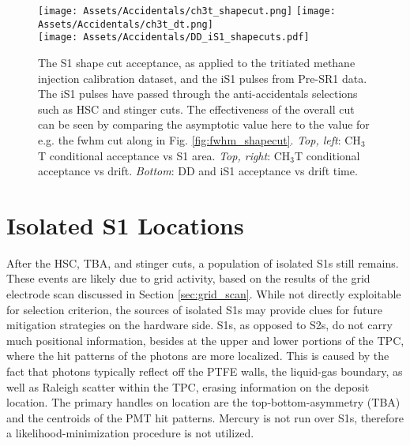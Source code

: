 \begin{figure}
    \centering
    \texttt{[image: Assets/Accidentals/ch3t\_shapecut.png]}
    \texttt{[image: Assets/Accidentals/ch3t\_dt.png]}\\
    \texttt{[image: Assets/Accidentals/DD\_iS1\_shapecuts.pdf]}
    \caption[The S1 shape cut acceptance, as applied to the tritiated methane injection calibration dataset, and the iS1 pulses from Pre-SR1 data.]%
    {The S1 shape cut acceptance, as applied to the tritiated methane injection calibration dataset, and the iS1 pulses from Pre-SR1 data.
    The iS1 pulses have passed through the anti-accidentals selections such as HSC and stinger cuts.
    The effectiveness of the overall cut can be seen by comparing the asymptotic value here to the value for e.g. the fwhm cut along in Fig. \ref{fig:fwhm_shapecut}.
    \textit{Top, left}: CH$_3$T conditional acceptance vs S1 area.
    \textit{Top, right}: CH$_3$T conditional acceptance vs drift.
    \textit{Bottom}: DD and iS1 acceptance vs drift time.
    }
    \label{fig:ch3t_shapecut}
\end{figure}


\afterpage{\FloatBarrier}
\section{Isolated S1 Locations}

After the HSC, TBA, and stinger cuts, a population of isolated S1s still remains. 
These events are likely due to grid activity, based on the results of the grid electrode scan discussed in Section \ref{sec:grid_scan}.
While not directly exploitable for selection criterion, the sources of isolated S1s may provide clues for future mitigation strategies on the hardware side.
S1s, as opposed to S2s, do not carry much positional information, besides at the upper and lower portions of the TPC, where the hit patterns of the photons are more localized.
This is caused by the fact that photons typically reflect off the PTFE walls, the liquid-gas boundary, as well as Raleigh scatter within the TPC, erasing information on the deposit location.
The primary handles on location are the top-bottom-asymmetry (TBA) and the centroids of the PMT hit patterns.
Mercury is not run over S1s, therefore a likelihood-minimization procedure is not utilized.


